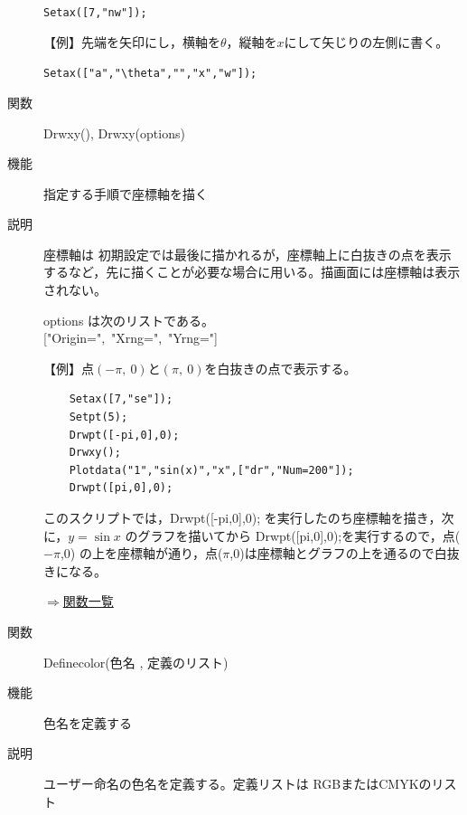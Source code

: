 \documentclass[papersize,a4paper,12pt,uplatex]{jsarticle}
\begin{document}
\begin{description}
\hspace{10mm}  \verb|Setax([7,"nw"]);|

【例】先端を矢印にし，横軸を$\theta$，縦軸を$x$にして矢じりの左側に書く。

\hspace{10mm} \verb|Setax(["a","\theta","","x","w"]);|

\vspace{\baselineskip}
\hspace{10mm}


\vspace{\baselineskip}
\hypertarget{drwxy}{}
\item[関数]  Drwxy(), Drwxy(options)
\item[機能]  指定する手順で座標軸を描く
\item[説明]  座標軸は 初期設定では最後に描かれるが，座標軸上に白抜きの点を表示するなど，先に描くことが必要な場合に用いる。描画面には座標軸は表示されない。

options は次のリストである。\\
\hspace*{10mm}["Origin=",\ "Xrng=",\ "Yrng="]

【例】点$(-\pi,\ 0)$と$(\pi,\ 0)$を白抜きの点で表示する。
\begin{verbatim}
    Setax([7,"se"]);
    Setpt(5);
    Drwpt([-pi,0],0);
    Drwxy();
    Plotdata("1","sin(x)","x",["dr","Num=200"]);
    Drwpt([pi,0],0);
\end{verbatim}

  このスクリプトでは，Drwpt([-pi,0],0); を実行したのち座標軸を描き，次に，$y=\sin x$ のグラフを描いてから Drwpt([pi,0],0);を実行するので，点($-\pi$,0) の上を座標軸が通り，点($\pi$,0)は座標軸とグラフの上を通るので白抜きになる。\\

\begin{center} \end{center}

\begin{flushright}  \hyperlink{functionlist}{$\Rightarrow$関数一覧}\end{flushright}

\vspace{\baselineskip}
\hypertarget{definecolor}{}
\item[関数]  Definecolor(色名 , 定義のリスト)
\item[機能]  色名を定義する
\item[説明]  ユーザー命名の色名を定義する。定義リストは RGBまたはCMYKのリスト


\end{description}
\end{document}
